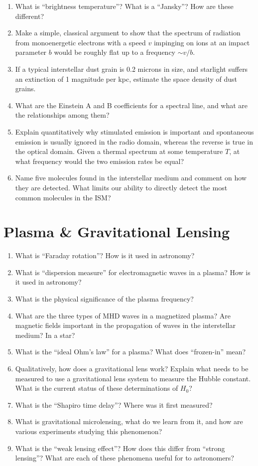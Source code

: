 \documentclass[10pt, oneside]{book}
\begin{document}
\begin{enumerate}[start=72]
    \item What is ``brightness temperature''? What is a ``Jansky''? How are these different?
    \item Make a simple, classical argument to show that the spectrum of radiation from monoenergetic electrons with a speed $v$ impinging on ions at an impact parameter $b$ would be roughly flat up to a frequency $\sim v/b$.
    \item If a typical interstellar dust grain is 0.2 microns in size, and starlight suffers an extinction of 1 magnitude per kpc, estimate the space density of dust grains.
    \item What are the Einstein A and B coefficients for a spectral line, and what are the relationships among them?
    \item Explain quantitatively why stimulated emission is important and spontaneous emission is usually ignored in the radio domain, whereas the reverse is true in the optical domain. Given a thermal spectrum at some temperature $T$, at what frequency would the two emission rates be equal?
    \item Name five molecules found in the interstellar medium and comment on how they are detected. What limits our ability to directly detect the most common molecules in the ISM?
\end{enumerate}

\section{Plasma \& Gravitational Lensing}

\begin{enumerate}[start=91]
    \item What is ``Faraday rotation''? How is it used in astronomy?
    \item What is ``dispersion measure'' for electromagnetic waves in a plasma? How is it used in astronomy?
    \item What is the physical significance of the plasma frequency?
    \item What are the three types of MHD waves in a magnetized plasma? Are magnetic fields important in the propagation of waves in the interstellar medium? In a star?
    \item What is the ``ideal Ohm's law'' for a plasma? What does ``frozen-in'' mean?
    \item Qualitatively, how does a gravitational lens work? Explain what needs to be measured to use a gravitational lens system to measure the Hubble constant. What is the current status of these determinations of $H_{0}$?
    \item What is the ``Shapiro time delay''? Where was it first measured?
    \item What is gravitational microlensing, what do we learn from it, and how are various experiments studying this phenomenon?
    \item What is the ``weak lensing effect''? How does this differ from ``strong lensing''? What are each of these phenomena useful for to astronomers?
\end{enumerate}
\end{document}
